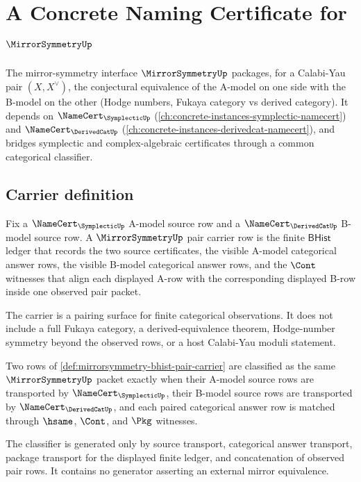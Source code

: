 \chapter{A Concrete Naming Certificate for $\MirrorSymmetryUp$}
\label{ch:concrete-instances-mirrorsymmetry-namecert}

The mirror-symmetry interface $\MirrorSymmetryUp$ packages, for a Calabi-Yau pair $(X, X^\vee)$, the conjectural equivalence of the A-model on one side with the B-model on the other (Hodge numbers, Fukaya category vs derived category). It depends on $\NameCert_{\SymplecticUp}$ (\autoref{ch:concrete-instances-symplectic-namecert}) and $\NameCert_{\DerivedCatUp}$ (\autoref{ch:concrete-instances-derivedcat-namecert}), and bridges symplectic and complex-algebraic certificates through a common categorical classifier.

\section{Carrier definition}
\label{sec:mirrorsymmetry-carrier}

\begin{definition}
\label{def:mirrorsymmetry-bhist-pair-carrier}
Fix a $\NameCert_{\SymplecticUp}$ A-model source row and a $\NameCert_{\DerivedCatUp}$ B-model source row. A $\MirrorSymmetryUp$ pair carrier row is the finite $\mathsf{BHist}$ ledger that records the two source certificates, the visible A-model categorical answer rows, the visible B-model categorical answer rows, and the $\Cont$ witnesses that align each displayed A-row with the corresponding displayed B-row inside one observed pair packet.

The carrier is a pairing surface for finite categorical observations. It does not include a full Fukaya category, a derived-equivalence theorem, Hodge-number symmetry beyond the observed rows, or a host Calabi-Yau moduli statement.
\end{definition}

\begin{definition}
\label{def:mirrorsymmetry-categorical-classifier}
Two rows of \autoref{def:mirrorsymmetry-bhist-pair-carrier} are classified as the same $\MirrorSymmetryUp$ packet exactly when their A-model source rows are transported by $\NameCert_{\SymplecticUp}$, their B-model source rows are transported by $\NameCert_{\DerivedCatUp}$, and each paired categorical answer row is matched through $\hsame$, $\Cont$, and $\Pkg$ witnesses.

The classifier is generated only by source transport, categorical answer transport, package transport for the displayed finite ledger, and concatenation of observed pair rows. It contains no generator asserting an external mirror equivalence.
\end{definition}

